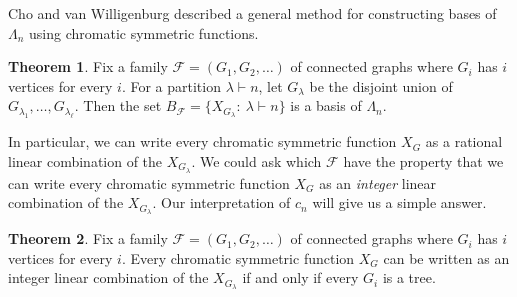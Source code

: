 \documentclass[12pt]{amsart}  %
\theoremstyle{definition}
\newtheorem{theorem}{Theorem}[section]
\theoremstyle{remark}
\numberwithin{equation}{section}
\begin{document}
Cho and van Willigenburg described a general method for constructing bases of $\Lambda_n$ using chromatic symmetric functions.

\begin{theorem} \cite[Theorem 5]{chrombases}
Fix a family $\mathcal F=(G_1,G_2,\ldots)$ of connected graphs where $G_i$ has $i$ vertices for every $i$. For a partition $\lambda\vdash n$, let $G_\lambda$ be the disjoint union of $G_{\lambda_1},\ldots,G_{\lambda_\ell}$. Then the set $B_{\mathcal F}=\{X_{G_\lambda}: \ \lambda\vdash n\}$ is a basis of $\Lambda_n$. 
\end{theorem}

In particular, we can write every chromatic symmetric function $X_G$ as a rational linear combination of the $X_{G_\lambda}$. We could ask which $\mathcal F$ have the property that we can write every chromatic symmetric function $X_G$ as an \emph{integer} linear combination of the $X_{G_\lambda}$. Our interpretation of $c_n$ will give us a simple answer.

\begin{theorem}
Fix a family $\mathcal F=(G_1,G_2,\ldots)$ of connected graphs where $G_i$ has $i$ vertices for every $i$. Every chromatic symmetric function $X_G$ can be written as an integer linear combination of the $X_{G_\lambda}$ if and only if every $G_i$ is a tree. 
\end{theorem}
\end{document}
